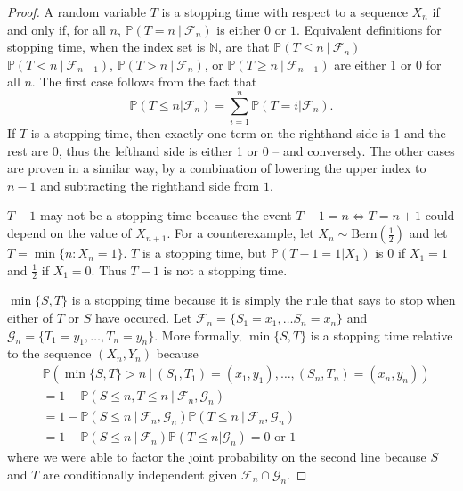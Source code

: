 \documentclass[12pt]{article}
\newcommand{\N}{\mathbb{N}}
\newcommand{\p}{\mathbb{P}}
\theoremstyle{definition}
\begin{document}
\begin{proof}
A random variable $T$ is a stopping time with respect to a sequence $X_n$ if and only if, for all $n$, $\p\left(T = n \ | \ \mathcal{F}_n\right)$ is either $0$ or $1$.  Equivalent definitions for stopping time, when the index set is $\N$, are that $\p\left(T \leq n \ | \ \mathcal{F}_{n}\right)$ $\p\left(T < n \ | \ \mathcal{F}_{n-1}\right)$, $\p\left(T > n \ | \ \mathcal{F}_{n}\right)$, or $\p\left(T \geq n \ | \ \mathcal{F}_{n-1}\right)$ are either 1 or 0 for all $n$.  The first case follows from the fact that $$\p\left(T \leq n | \mathcal{F}_n\right) = \sum_{i=1}^{n} \p\left(T = i | \mathcal{F}_n\right).$$  If $T$ is a stopping time, then exactly one term on the righthand side is 1 and the rest are 0, thus the lefthand side is either 1 or 0 -- and conversely.  The other cases are proven in a similar way, by a combination of lowering the upper index to $n-1$ and subtracting the righthand side from $1$.

$T - 1$ may not be a stopping time because the event $T - 1 = n \iff T = n+1$ could depend on the value of $X_{n+1}$.  For a counterexample, let $X_n \sim \text{Bern}\left(\frac12\right)$ and let $T = \min \{n : X_n = 1 \}$.  $T$ is a stopping time, but $\p\left(T - 1 = 1 | X_1\right)$ is $0$ if $X_1 = 1$ and $\frac12$ if $X_1 = 0$.  Thus $T - 1$ is not a stopping time.

$\min \{ S,T \}$ is a stopping time because it is simply the rule that says to stop when either of $T$ or $S$ have occured.  Let $\mathcal{F}_n = \{S_1 = x_1, \dots S_n = x_n\}$ and $\mathcal{G}_n = \{ T_1 = y_1, \dots , T_n = y_n \}$.
More formally, $\min \{S, T \}$ is a stopping time relative to the sequence $\left(X_n, Y_n\right)$ because
\begin{align*}
&\p\left(\min \{S, T \} > n \ | \ \left(S_1,T_1\right) = \left(x_1,y_1\right), \dots , \left(S_n,T_n\right) = \left(x_n,y_n\right) \right)
\\
&= 1 - \p\left(S \leq n, T \leq n \ | \ \mathcal{F}_n, \mathcal{G}_n \right)
\\
&= 1 - \p\left(S \leq n \ | \ \mathcal{F}_n, \mathcal{G}_n \right)\p\left(T \leq n \ | \ \mathcal{F}_n, \mathcal{G}_n \right)
\\
&= 1 - \p\left(S \leq n \ | \ \mathcal{F}_n \right)\p\left(T \leq n | \mathcal{G}_n \right) = 0 \text{ or } 1
\end{align*}
where we were able to factor the joint probability on the second line because $S$ and $T$ are conditionally independent given $\mathcal{F}_n \cap \mathcal{G}_n$.


\end{proof}
\end{document}

